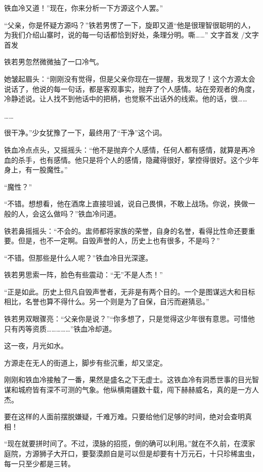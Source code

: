 
\begin{this_body}

铁血冷又道！”现在，你来分析一下方源这个人罢。”

“父亲，你是怀疑方源吗？”铁若男愣了一下，旋即又道“他是很理智很聪明的人，为我们介绍山寨时，说的每一句话都恰到好处，条理分明。嘶……” 文字首发 /文字首发

铁若男忽然微微抽了一口冷气。

她皱起眉头：“刚刚没有觉得，但是父亲你现在一提醒，我发现了！这个方源太会说话了，他说的每一句话，都是客观事实，抛弃了个人感情。站在旁观者的角度，冷静述说。让人找不到他话中的把柄，也觉察不出话外的线索。他的话，很……

……

很干净。”少女犹豫了一下，最终用了“干净”这个词。

铁血冷点点头，又摇摇头：“他不是抛弃个人感情，任何人都有感情，就算是再冷血的杀手，也有感情。他只是将个人的感情，隐藏得很好，掌控得很好。这个少年身上，有一股魔性。”

“魔性？”

“不错。想想看，他在酒席上直接坦诚，说自己畏惧，不敢上战场。你说，换做一般的人，会这么做吗？”铁血冷问道。

铁若鼻摇摇头：“不会的。盅师都将家族的荣誉，自身的名誉，看得比性命还要重要。但是，也不一定啊。自毁声誉的人，历史上也有很多，不是吗？”

“不错。但那些是什么人呢？”铁血冷目光深邃。

铁若男思索一阵，脸色有些震动：“无”不是人杰！”

“正是如此。历史上但凡自毁声誉者，无非是有两个目的。一个是图谋远大和目标相比，名誉也算不得什么。另一个则是为了自保，自污而避猜忌。”

铁若男双眼骤亮：“父亲你是说？”“你多想了，只是觉得这少年很有意思。可惜他只有丙等资质……………”铁血冷却道。

这一夜，月光如水。

方源走在无人的街道上，脚步有些沉重，却又坚定。

刚刚和铁血冷接触了一番，果然是盛名之下无虚士。这铁血冷有洞悉世事的目光智谋和城府皆有深不可测的气象。他纵横南疆数十载，闯下赫赫威名，真的是一方人杰。

要在这样的人面前摆脱嫌疑，千难万难。只要给他们足够的时间，绝对会查明真相！

“现在就要拼时间了。不过，漠脉的招揽，倒的确可以利用。”就在不久前，在漠家庭院，方源狮子大开口，要娶漠颜自是可以但是却要有十万元石，十只珍稀盅虫，每一只至少都是三转。


\end{this_body}
